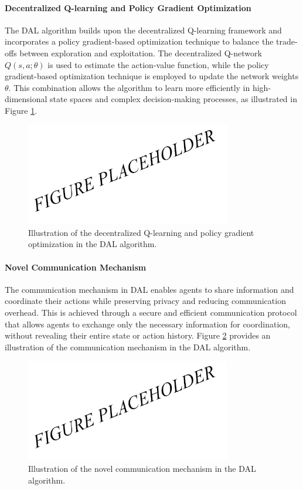 \paragraph{Decentralized Q-learning and Policy Gradient Optimization}

The DAL algorithm builds upon the decentralized Q-learning framework and incorporates a policy gradient-based optimization technique to balance the trade-offs between exploration and exploitation. The decentralized Q-network $Q(s, a; \theta)$ is used to estimate the action-value function, while the policy gradient-based optimization technique is employed to update the network weights $\theta$. This combination allows the algorithm to learn more efficiently in high-dimensional state spaces and complex decision-making processes, as illustrated in Figure \ref{fig2}.

\begin{figure}[h]
  \centering
  \includegraphics[width=0.8\textwidth]{fig2.png}
  \caption{Illustration of the decentralized Q-learning and policy gradient optimization in the DAL algorithm.}
  \label{fig2}
\end{figure}

\paragraph{Novel Communication Mechanism}

The communication mechanism in DAL enables agents to share information and coordinate their actions while preserving privacy and reducing communication overhead. This is achieved through a secure and efficient communication protocol that allows agents to exchange only the necessary information for coordination, without revealing their entire state or action history. Figure \ref{fig3} provides an illustration of the communication mechanism in the DAL algorithm.

\begin{figure}[h]
  \centering
  \includegraphics[width=0.8\textwidth]{fig3.png}
  \caption{Illustration of the novel communication mechanism in the DAL algorithm.}
  \label{fig3}
\end{figure}

